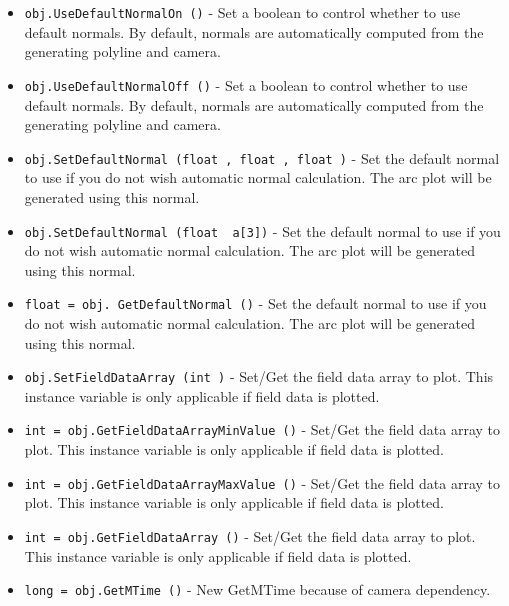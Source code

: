 \begin{itemize}
\item  \verb|obj.UseDefaultNormalOn ()| -  Set a boolean to control whether to use default normals.
 By default, normals are automatically computed from the generating
 polyline and camera.

\item  \verb|obj.UseDefaultNormalOff ()| -  Set a boolean to control whether to use default normals.
 By default, normals are automatically computed from the generating
 polyline and camera.

\item  \verb|obj.SetDefaultNormal (float , float , float )| -  Set the default normal to use if you do not wish automatic normal
 calculation. The arc plot will be generated using this normal.

\item  \verb|obj.SetDefaultNormal (float  a[3])| -  Set the default normal to use if you do not wish automatic normal
 calculation. The arc plot will be generated using this normal.

\item  \verb|float = obj. GetDefaultNormal ()| -  Set the default normal to use if you do not wish automatic normal
 calculation. The arc plot will be generated using this normal.

\item  \verb|obj.SetFieldDataArray (int )| -  Set/Get the field data array to plot. This instance variable is
 only applicable if field data is plotted.

\item  \verb|int = obj.GetFieldDataArrayMinValue ()| -  Set/Get the field data array to plot. This instance variable is
 only applicable if field data is plotted.

\item  \verb|int = obj.GetFieldDataArrayMaxValue ()| -  Set/Get the field data array to plot. This instance variable is
 only applicable if field data is plotted.

\item  \verb|int = obj.GetFieldDataArray ()| -  Set/Get the field data array to plot. This instance variable is
 only applicable if field data is plotted.

\item  \verb|long = obj.GetMTime ()| -  New GetMTime because of camera dependency.

\end{itemize}
